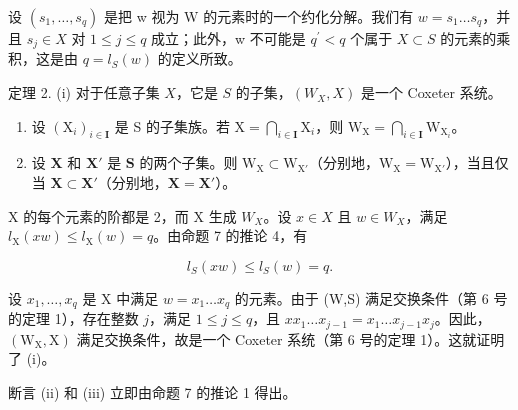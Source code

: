设 \((s_{1},\ldots,s_{q})\) 是把 w 视为 W 的元素时的一个约化分解。我们有 \(w=s_{1}\ldots s_{q}\)，并且 \(s_{j}\in X\) 对 \(1\leqslant j\leqslant q\) 成立；此外，w 不可能是 \(q^{\prime}<q\) 个属于 \(X\subset S\) 的元素的乘积，这是由 \(q=l_{S}(w)\) 的定义所致。

定理 2. (i) 对于任意子集 \(X\)，它是 \(S\) 的子集，\((W_X, X)\) 是一个 Coxeter 系统。

\begin{enumerate}
\def\labelenumi{(\roman{enumi})}
\setcounter{enumi}{1}
\item
  设 \((\mathrm{X}_i)_{i\in \mathbf{I}}\) 是 S 的子集族。若 \(\mathrm{X} = \bigcap_{i\in \mathbf{I}}\mathrm{X}_i\)，则 \(\mathrm{W_X} = \bigcap_{i\in \mathbf{I}}\mathrm{W}_{\mathrm{X}_i}\)。
\item
  设 \(\mathbf{X}\) 和 \(\mathbf{X}'\) 是 \(\mathbf{S}\) 的两个子集。则 \(\mathrm{W_X} \subset \mathrm{W_{X'}}\)（分别地，\(\mathrm{W_X} = \mathrm{W_{X'}}\)），当且仅当 \(\mathbf{X} \subset \mathbf{X'}\)（分别地，\(\mathbf{X} = \mathbf{X'}\)）。
\end{enumerate}

X 的每个元素的阶都是 2，而 X 生成 \(W_{X}\)。设 \(x \in X\) 且 \(w \in W_{X}\)，满足 \(l_{\mathrm{X}}(xw) \leqslant l_{\mathrm{X}}(w) = q\)。由命题 7 的推论 4，有

\[
l _ {S} (x w) \leqslant l _ {S} (w) = q.
\]

设 \(x_{1},\ldots ,x_{q}\) 是 X 中满足 \(w = x_{1}\dots x_{q}\) 的元素。由于 (W,S) 满足交换条件（第 6 号的定理 1），存在整数 \(j\)，满足 \(1\leqslant j\leqslant q\)，且 \(xx_{1}\ldots x_{j - 1} = x_{1}\ldots x_{j - 1}x_{j}\)。因此，\((\mathrm{W_X},\mathrm{X})\) 满足交换条件，故是一个 Coxeter 系统（第 6 号的定理 1）。这就证明了 (i)。

断言 (ii) 和 (iii) 立即由命题 7 的推论 1 得出。

